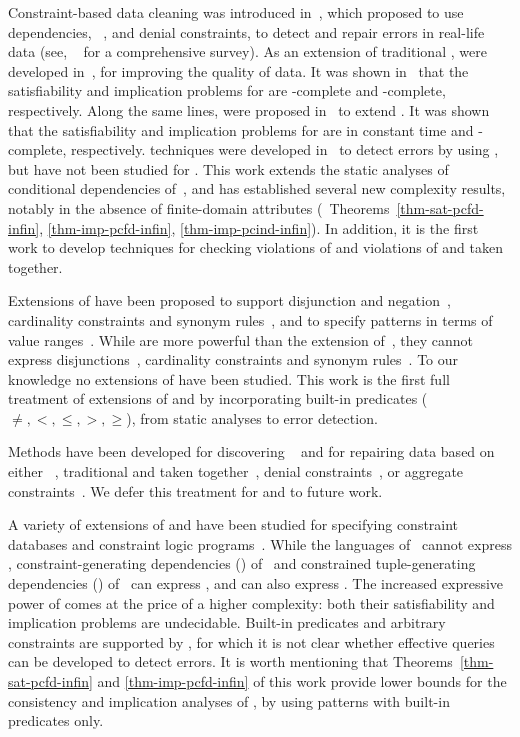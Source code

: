 Constraint-based data cleaning was introduced in~\cite{leo99}, which
proposed to use dependencies, \eg~\FDs, \INDs and denial
constraints, to detect and repair errors in real-life data (see,
\eg~\cite{Chomicki07} for a comprehensive survey). As an extension
of traditional \FDs, \CFDs were developed in~\cite{CFDs}, for
improving the quality of data. It was shown in~\cite{CFDs} that the
satisfiability and implication problems for \CFDs are \NP-complete
and \coNP-complete, respectively. Along the same lines, \CINDs were
proposed in~\cite{CINDs} to extend \INDs. It was shown~\cite{CINDs}
that the satisfiability and implication problems for \CINDs are in
constant time and \EXPTIME-complete, respectively. \SQL techniques
were developed in~\cite{CFDs} to detect errors by using \CFDs, but
have not been studied for \CINDs. This work extends the static
analyses of conditional dependencies of~\cite{CFDs,CINDs}, and has
established several new complexity results, notably in the absence
of finite-domain attributes (\eg~Theorems~\ref{thm-sat-pcfd-infin},
\ref{thm-imp-pcfd-infin}, \ref{thm-imp-pcind-infin}). In addition,
it is the first work to develop \SQL techniques for checking
violations of \CINDs and violations of \pCFDs and \pCINDs taken
together.

Extensions of \CFDs have been proposed to support disjunction and
negation~\cite{icde08}, cardinality constraints and synonym
rules~\cite{ChenFM09}, and to specify patterns in terms of value
ranges~\cite{divesh08}. While \pCFDs are more powerful than the
extension of~\cite{divesh08}, they cannot express
disjunctions~\cite{icde08}, cardinality constraints and synonym
rules~\cite{ChenFM09}. To our knowledge no extensions of \CINDs have
been studied. This work is the first full treatment of extensions of
\CFDs and \CINDs by incorporating built-in predicates ($\ne, <, \le,
>, \ge$), from static analyses to error detection.

Methods have been developed for discovering
\CFDs~\cite{CM08,divesh08,icde09} and for repairing data based on
either \CFDs~\cite{repair}, traditional \FDs and \INDs taken
together~\cite{sigmod05}, denial
constraints~\cite{BertossiBFL08,ChomickiM05}, or aggregate
constraints~\cite{FlescaFP05}. We defer this treatment 
for \pCFDs and \pCINDs to future work.


A variety of extensions of \FDs and \INDs have been studied for
specifying constraint databases and constraint logic
programs~\cite{BCW99,BP83,Maher97,MS96}. While the languages
of~\cite{BCW99,Maher97} cannot express \CFDs,
constraint-generating dependencies (\CGDs)
of~\cite{BCW99} and constrained tuple-generating dependencies
(\CTGDs) of~\cite{MS96} can express \pCFDs,
and \CTGDs can also express \pCINDs. The increased expressive
power of \CTGDs comes at the price of a higher complexity:
both their satisfiability and implication problems are undecidable.
Built-in predicates and arbitrary constraints are supported
by \CGDs, for which it is not clear whether effective \SQL
queries can be developed to detect errors. It is worth mentioning
that Theorems~\ref{thm-sat-pcfd-infin} and \ref{thm-imp-pcfd-infin}
of this work provide lower bounds for the consistency and implication analyses
of \CGDs, by using patterns with built-in predicates only.

